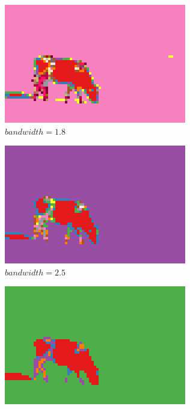 \documentclass[10pt,a4paper,twoside]{article}
\newcommand{\sweepsize}{0.24}
\begin{document}
\begin{figure}[h]
    \centering

    \begin{subfigure}{\sweepsize\textwidth}
    \includegraphics[width=0.9\linewidth]{result_1.8.png} 
    \caption{$bandwidth=1.8$}
    \end{subfigure}
    \begin{subfigure}{\sweepsize\textwidth}
    \includegraphics[width=0.9\linewidth]{result_2.5.png} 
    \caption{$bandwidth=2.5$}
    \end{subfigure}
    \begin{subfigure}{\sweepsize\textwidth}
    \includegraphics[width=0.9\linewidth]{result_3.8.png} 

\end{subfigure}
\end{figure}
\end{document}
